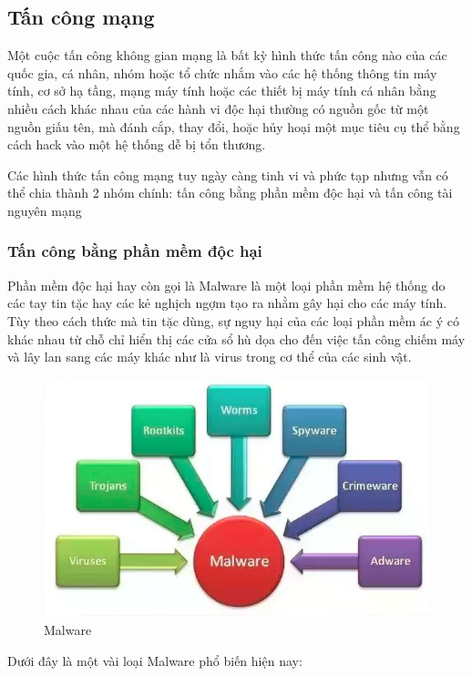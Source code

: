 \subsection{Tấn công mạng}
Một cuộc tấn công không gian mạng là bất kỳ hình thức tấn công nào của các quốc gia, cá nhân, nhóm hoặc tổ chức nhắm vào các hệ thống thông tin máy tính, cơ sở hạ tầng, mạng máy tính hoặc các thiết bị máy tính cá nhân bằng nhiều cách khác nhau của các hành vi độc hại thường có nguồn gốc từ một nguồn giấu tên, mà đánh cắp, thay đổi, hoặc hủy hoại một mục tiêu cụ thể bằng cách hack vào một hệ thống dễ bị tổn thương.

Các hình thức tấn công mạng tuy ngày càng tinh vi và phức tạp nhưng vẫn có thể chia thành 2 nhóm chính: tấn công bằng phần mềm độc hại và tấn công tài nguyên mạng
\subsubsection*{Tấn công bằng phần mềm độc hại}
Phần mềm độc hại hay còn gọi là Malware là một loại phần mềm hệ thống do các tay tin tặc hay các kẻ nghịch ngợm tạo ra nhằm gây hại cho các máy tính. Tùy theo cách thức mà tin tặc dùng, sự nguy hại của các loại phần mềm ác ý có khác nhau từ chỗ chỉ hiển thị các cửa sổ hù dọa cho đến việc tấn công chiếm máy và lây lan sang các máy khác như là virus trong cơ thể của các sinh vật.
\begin{figure}[H]
    \centering
    \includegraphics{malware}
    \caption{Malware}
     
\end{figure}
Dưới đây là một vài loại Malware phổ biến hiện nay:
